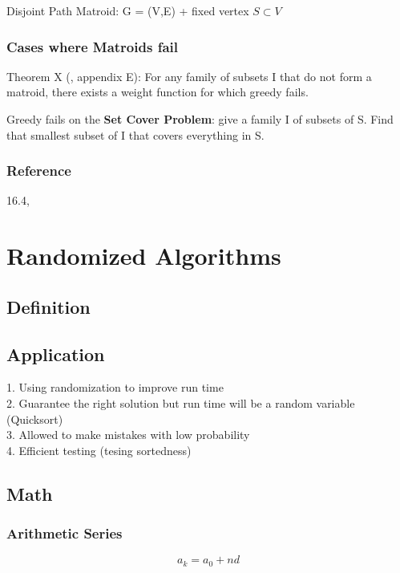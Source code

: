 \documentclass[12pt,article]{article}
\begin{document}
Disjoint Path Matroid: G = (V,E) + fixed vertex $S \subset V$

\subsubsection{Cases where Matroids fail}

Theorem X (\cite{JeffE19}, appendix E): For any family of subsets I that do not form a matroid, there exists a weight function for which greedy fails.

Greedy fails on the \textbf{Set Cover Problem}: give a family I of subsets of S. Find that smallest subset of I that covers everything in S. 

\subsubsection{Reference}
16.4, \cite{CLRS}


\newpage
\section{Randomized Algorithms}

\subsection{Definition}

\subsection{Application}
1. Using randomization to improve run time \\
2. Guarantee the right solution but run time will be a random variable (Quicksort) \\
3. Allowed to make mistakes with low probability \\
4. Efficient testing (tesing sortedness)

\subsection{Math}

\subsubsection{Arithmetic Series}

$$a_k = a_0 + nd$$
\end{document}

